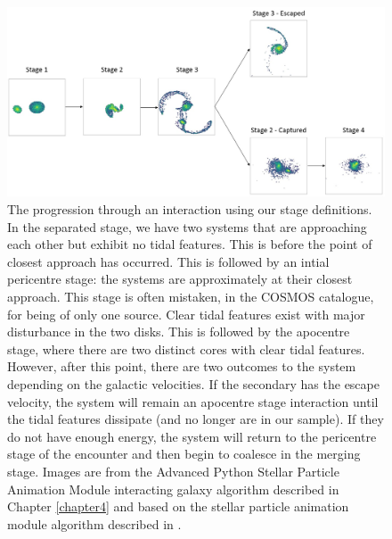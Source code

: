 \begin{figure}
\centering
\includegraphics[width=\textwidth]{Chapter3/figures/stage-evolution.jpg}
\caption[The progression through an interaction using our stage definitions.]{The progression through an interaction using our stage definitions. In the separated stage, we have two systems that are approaching each other but exhibit no tidal features. This is before the point of closest approach has occurred. This is followed by an intial pericentre stage: the systems are approximately at their closest approach. This stage is often mistaken, in the COSMOS catalogue, for being of only one source. Clear tidal features exist with major disturbance in the two disks. This is followed by the apocentre stage, where there are two distinct cores with clear tidal features. However, after this point, there are two outcomes to the system depending on the galactic velocities. If the secondary has the escape velocity, the system will remain an apocentre stage interaction until the tidal features dissipate (and no longer are in our sample). If they do not have enough energy, the system will return to the pericentre stage of the encounter and then begin to coalesce in the merging stage. Images are from the Advanced Python Stellar Particle Animation Module interacting galaxy algorithm described in Chapter \ref{chapter4} and based on the stellar particle animation module algorithm described in \citet{2016A&C....16...26W}.}
\label{fig:illustration}
\end{figure}

